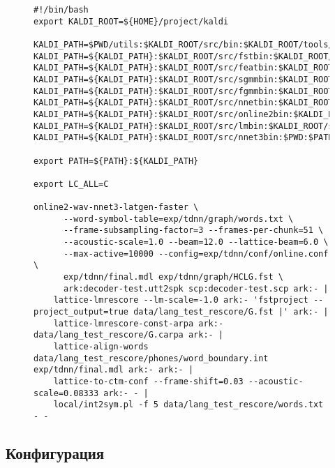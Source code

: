 \begin{figure}[h]
\begin{lstlisting}[caption={Запуск Kaldi},label={kaldi:run}]
#!/bin/bash
export KALDI_ROOT=${HOME}/project/kaldi

KALDI_PATH=$PWD/utils:$KALDI_ROOT/src/bin:$KALDI_ROOT/tools/openfst/bin
KALDI_PATH=${KALDI_PATH}:$KALDI_ROOT/src/fstbin:$KALDI_ROOT/src/gmmbin
KALDI_PATH=${KALDI_PATH}:$KALDI_ROOT/src/featbin:$KALDI_ROOT/src/lm
KALDI_PATH=${KALDI_PATH}:$KALDI_ROOT/src/sgmmbin:$KALDI_ROOT/src/sgmm2bin
KALDI_PATH=${KALDI_PATH}:$KALDI_ROOT/src/fgmmbin:$KALDI_ROOT/src/latbin
KALDI_PATH=${KALDI_PATH}:$KALDI_ROOT/src/nnetbin:$KALDI_ROOT/src/nnet2bin
KALDI_PATH=${KALDI_PATH}:$KALDI_ROOT/src/online2bin:$KALDI_ROOT/src/ivectorbin
KALDI_PATH=${KALDI_PATH}:$KALDI_ROOT/src/lmbin:$KALDI_ROOT/src/chainbin
KALDI_PATH=${KALDI_PATH}:$KALDI_ROOT/src/nnet3bin:$PWD:$PATH:$KALDI_ROOT/tools/sph2pipe_v2.5

export PATH=${PATH}:${KALDI_PATH}

export LC_ALL=C

online2-wav-nnet3-latgen-faster \
      --word-symbol-table=exp/tdnn/graph/words.txt \
      --frame-subsampling-factor=3 --frames-per-chunk=51 \
      --acoustic-scale=1.0 --beam=12.0 --lattice-beam=6.0 \
      --max-active=10000 --config=exp/tdnn/conf/online.conf \
      exp/tdnn/final.mdl exp/tdnn/graph/HCLG.fst \
      ark:decoder-test.utt2spk scp:decoder-test.scp ark:- |
    lattice-lmrescore --lm-scale=-1.0 ark:- 'fstproject --project_output=true data/lang_test_rescore/G.fst |' ark:- |
    lattice-lmrescore-const-arpa ark:- data/lang_test_rescore/G.carpa ark:- |
    lattice-align-words data/lang_test_rescore/phones/word_boundary.int exp/tdnn/final.mdl ark:- ark:- |
    lattice-to-ctm-conf --frame-shift=0.03 --acoustic-scale=0.08333 ark:- - |
    local/int2sym.pl -f 5 data/lang_test_rescore/words.txt - -
\end{lstlisting}
\end{figure}

\subsection{Конфигурация}
